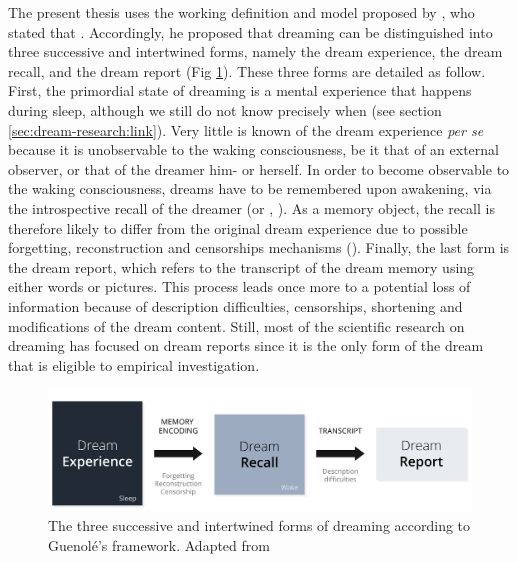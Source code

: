The present thesis uses the working definition and model proposed by \citet{guenole_a_2009}, who stated that . Accordingly, he proposed that dreaming can be distinguished into three successive and intertwined forms, namely the dream experience, the dream recall, and the dream report (Fig \ref{fig:intro:guenole}). These three forms are detailed as follow. First, the primordial state of dreaming is a mental experience that happens during sleep, although we still do not know precisely when (see section \ref{sec:dream-research:link}). Very little is known of the dream experience \emph{per se} because it is unobservable to the waking consciousness, be it that of an external observer, or that of the dreamer him- or herself. In order to become observable to the waking consciousness, dreams have to be remembered upon awakening, via the introspective recall of the dreamer (or , \citealp{schwartz_dreaming:_2005}). As a memory object, the recall is therefore likely to differ from the original dream experience due to possible forgetting, reconstruction and censorships mechanisms (\cite{schwartz_sleep_2002, schwartz_dreaming:_2005}). Finally, the last form is the dream report, which refers to the transcript of the dream memory using either words or pictures. This process leads once more to a potential loss of information because of description difficulties, censorships, shortening and modifications of the dream content. Still, most of the scientific research on dreaming has focused on dream reports since it is the only form of the dream that is eligible to empirical investigation.

\begin{figure}[htb]
	\includegraphics[width=\textwidth]{Fig/Intro/Intro_Guenole/Intro_Guenole.png}
	\caption[Guénolé's model of dreaming]{The three successive and intertwined forms of dreaming according to Guenolé's framework. Adapted from \citet{guenole_a_2009}}
	\label{fig:intro:guenole}
\end{figure}

